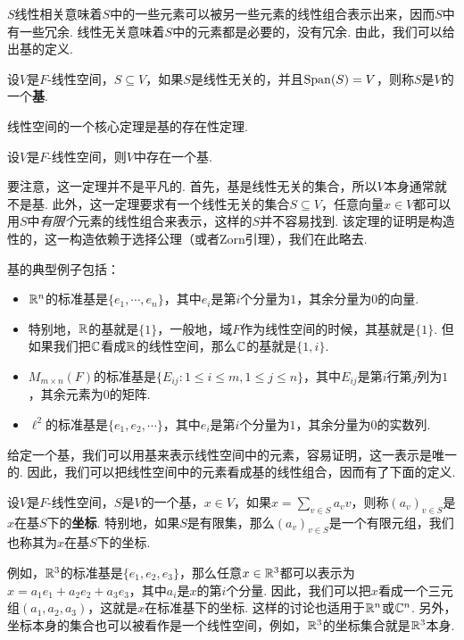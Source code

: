 $S$线性相关意味着$S$中的一些元素可以被另一些元素的线性组合表示出来，因而$S$中有一些冗余. 线性无关意味着$S$中的元素都是必要的，没有冗余. 由此，我们可以给出基的定义. 

\begin{definition}[基]
设$V$是$F$-线性空间，$S\subseteq V$，如果$S$是线性无关的，并且$\operatorname*{Span}(S)=V$，则称$S$是$V$的一个\textbf{基}. 
\end{definition}

线性空间的一个核心定理是基的存在性定理. 

\begin{theorem}[基的存在性定理]\label{thm:existence-of-basis}
设$V$是$F$-线性空间，则$V$中存在一个基. 
\end{theorem}

要注意，这一定理并不是平凡的. 首先，基是线性无关的集合，所以$V$本身通常就不是基. 此外，这一定理要求有一个线性无关的集合$S\subseteq V$，任意向量$x\in V$都可以用$S$中\emph{有限个}元素的线性组合来表示，这样的$S$并不容易找到. 该定理的证明是构造性的，这一构造依赖于选择公理（或者Zorn引理），我们在此略去. 

基的典型例子包括：
\begin{itemize}
    \item $\mathbb{R}^n$的标准基是$\{e_1,\cdots,e_n\}$，其中$e_i$是第$i$个分量为$1$，其余分量为$0$的向量. 
    \item 特别地，$\mathbb{R}$的基就是$\{1\}$，一般地，域$F$作为线性空间的时候，其基就是$\{1\}$. 但如果我们把$\mathbb{C}$看成$\mathbb{R}$的线性空间，那么$\mathbb{C}$的基就是$\{1,i\}$.
    \item $M_{m\times n}(F)$的标准基是$\{E_{ij}:1\leq i\leq m,1\leq j\leq n\}$，其中$E_{ij}$是第$i$行第$j$列为$1$，其余元素为$0$的矩阵. 
    \item $\ell^2$的标准基是$\{e_1,e_2,\cdots\}$，其中$e_i$是第$i$个分量为$1$，其余分量为$0$的实数列. 
\end{itemize}

给定一个基，我们可以用基来表示线性空间中的元素，容易证明，这一表示是唯一的. 因此，我们可以把线性空间中的元素看成基的线性组合，因而有了下面的定义. 

\begin{definition}[坐标]
设$V$是$F$-线性空间，$S$是$V$的一个基，$x\in V$，如果$x=\sum_{v\in S} a_v v$，则称$(a_v)_{v\in S}$是$x$在基$S$下的\textbf{坐标}. 特别地，如果$S$是有限集，那么$(a_v)_{v\in S}$是一个有限元组，我们也称其为$x$在基$S$下的坐标. 
\end{definition}

例如，$\mathbb{R}^3$的标准基是$\{e_1,e_2,e_3\}$，那么任意$x\in\mathbb{R}^3$都可以表示为$x=a_1e_1+a_2e_2+a_3e_3$，其中$a_i$是$x$的第$i$个分量. 因此，我们可以把$x$看成一个三元组$(a_1,a_2,a_3)$，这就是$x$在标准基下的坐标. 这样的讨论也适用于$\mathbb{R}^n$或$\mathbb{C}^n$. 另外，坐标本身的集合也可以被看作是一个线性空间，例如，$\mathbb{R}^3$的坐标集合就是$\mathbb{R}^3$本身. 

